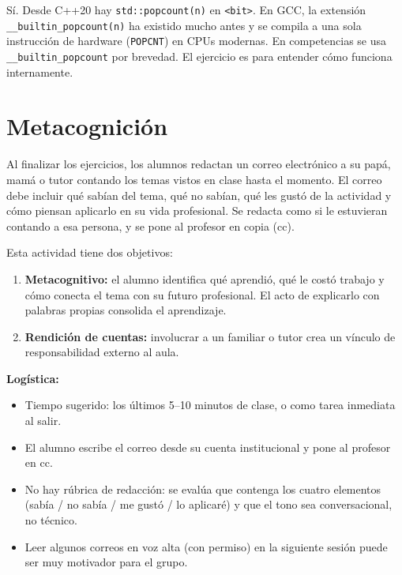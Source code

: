 \documentclass[12pt, oneside]{article}
\begin{document}
\begin{notaprofesor}
  Sí. Desde C++20 hay \texttt{std::popcount(n)} en \texttt{<bit>}.
  En GCC, la extensión \texttt{\_\_builtin\_popcount(n)} ha existido
  mucho antes y se compila a una sola instrucción de hardware (\texttt{POPCNT})
  en CPUs modernas. En competencias se usa \texttt{\_\_builtin\_popcount}
  por brevedad. El ejercicio es para entender cómo funciona internamente.
\end{notaprofesor}

\section{Metacognición}

Al finalizar los ejercicios, los alumnos redactan un correo electrónico a su
papá, mamá o tutor contando los temas vistos en clase hasta el momento.
El correo debe incluir qué sabían del tema, qué no sabían, qué les gustó de
la actividad y cómo piensan aplicarlo en su vida profesional.
Se redacta como si le estuvieran contando a esa persona, y se pone al
profesor en copia (cc).

\begin{notaprofesor}
  Esta actividad tiene dos objetivos:
  \begin{enumerate}
    \item \textbf{Metacognitivo:} el alumno identifica qué aprendió, qué le
          costó trabajo y cómo conecta el tema con su futuro profesional.
          El acto de explicarlo con palabras propias consolida el aprendizaje.
    \item \textbf{Rendición de cuentas:} involucrar a un familiar o tutor
          crea un vínculo de responsabilidad externo al aula.
  \end{enumerate}

  \textbf{Logística:}
  \begin{itemize}
    \item Tiempo sugerido: los últimos 5--10 minutos de clase, o como tarea
          inmediata al salir.
    \item El alumno escribe el correo desde su cuenta institucional y pone
          al profesor en cc.
    \item No hay rúbrica de redacción: se evalúa que contenga los cuatro
          elementos (sabía / no sabía / me gustó / lo aplicaré) y que el
          tono sea conversacional, no técnico.
    \item Leer algunos correos en voz alta (con permiso) en la siguiente
          sesión puede ser muy motivador para el grupo.
  \end{itemize}
\end{notaprofesor}
\end{document}
